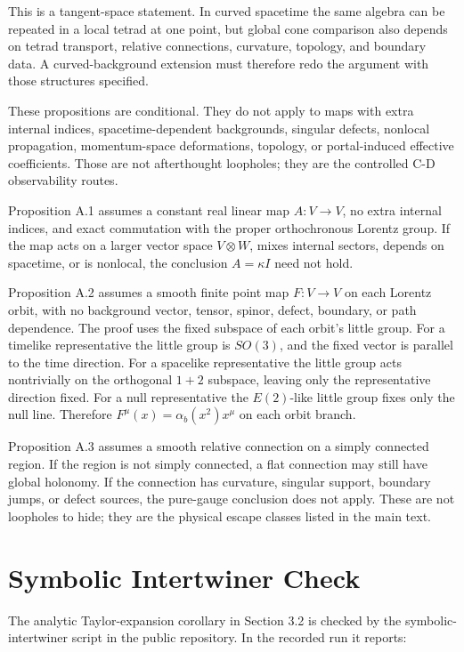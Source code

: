 \documentclass[11pt]{article}
\begin{document}
This is a tangent-space statement. In curved spacetime the same algebra can be repeated in a local tetrad at one point, but global cone comparison also depends on tetrad transport, relative connections, curvature, topology, and boundary data. A curved-background extension must therefore redo the argument with those structures specified.


These propositions are conditional. They do not apply to maps with extra internal indices, spacetime-dependent backgrounds, singular defects, nonlocal propagation, momentum-space deformations, topology, or portal-induced effective coefficients. Those are not afterthought loopholes; they are the controlled C-D observability routes.


Proposition A.1 assumes a constant real linear map \(A:V\to V\), no extra internal indices, and exact commutation with the proper orthochronous Lorentz group. If the map acts on a larger vector space \(V\otimes W\), mixes internal sectors, depends on spacetime, or is nonlocal, the conclusion \(A=\kappa I\) need not hold.


Proposition A.2 assumes a smooth finite point map \(F:V\to V\) on each Lorentz orbit, with no background vector, tensor, spinor, defect, boundary, or path dependence. The proof uses the fixed subspace of each orbit's little group. For a timelike representative the little group is \(SO(3)\), and the fixed vector is parallel to the time direction. For a spacelike representative the little group acts nontrivially on the orthogonal \(1+2\) subspace, leaving only the representative direction fixed. For a null representative the \(E(2)\)-like little group fixes only the null line. Therefore \(F^\mu(x)=\alpha_b(x^2)x^\mu\) on each orbit branch.


Proposition A.3 assumes a smooth relative connection on a simply connected region. If the region is not simply connected, a flat connection may still have global holonomy. If the connection has curvature, singular support, boundary jumps, or defect sources, the pure-gauge conclusion does not apply. These are not loopholes to hide; they are the physical escape classes listed in the main text.


\section{Symbolic Intertwiner Check}


The analytic Taylor-expansion corollary in Section 3.2 is checked by the symbolic-intertwiner script in the public repository. In the recorded run it reports:
\end{document}
